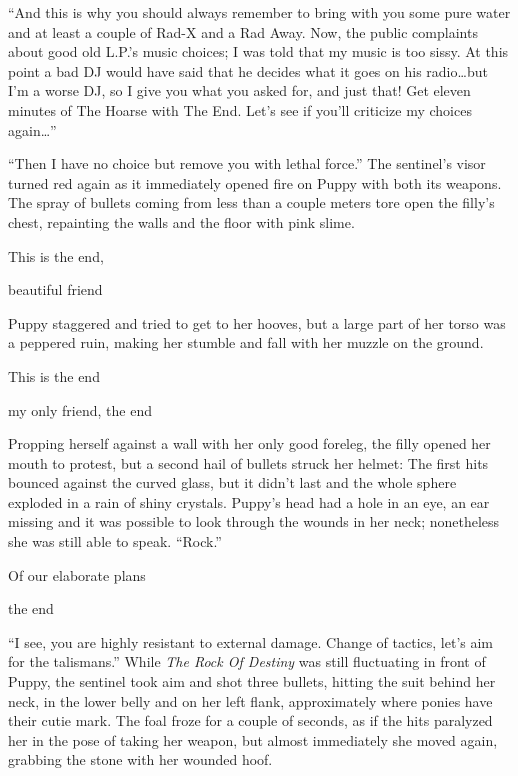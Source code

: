 ``{\rt And this is why you should always remember to bring with you some pure water and at least a couple of Rad-X and a Rad Away. Now, the public complaints about good old L.P.'s music choices; I was told that my music is too sissy. At this point a bad DJ would have said that he decides what it goes on his radio\dots but I'm a worse DJ, so I give you what you asked for, and just that! Get eleven minutes of The Hoarse with The End. Let's see if you'll criticize my choices again\dots}''

``Then I have no choice but remove you with lethal force.'' The sentinel's visor turned red again as it immediately opened fire on Puppy with both its weapons. The spray of bullets coming from less than a couple meters tore open the filly's chest, repainting the walls and the floor with pink slime.


\begin{song}
    This is the end,
    
    beautiful friend
\end{song}

Puppy staggered and tried to get to her hooves, but a large part of her torso was a peppered ruin, making her stumble and fall with her muzzle on the ground.


\begin{song}
    This is the end

    my only friend, the end
\end{song}

Propping herself against a wall with her only good foreleg, the filly opened her mouth to protest, but a second hail of bullets struck her helmet: The first hits bounced against the curved glass, but it didn't last and the whole sphere exploded in a rain of shiny crystals. Puppy's head had a hole in an eye, an ear missing and it was possible to look through the wounds in her neck; nonetheless she was still able to speak. ``Rock.''


\begin{song}
    Of our elaborate plans

    the end
\end{song}

``I see, you are highly resistant to external damage. Change of tactics, let's aim for the talismans.'' While \emph{The Rock Of Destiny} was still fluctuating in front of Puppy, the sentinel took aim and shot three bullets, hitting the suit behind her neck, in the lower belly and on her left flank, approximately where ponies have their cutie mark. The foal froze for a couple of seconds, as if the hits paralyzed her in the pose of taking her weapon, but almost immediately she moved again, grabbing the stone with her wounded hoof.


